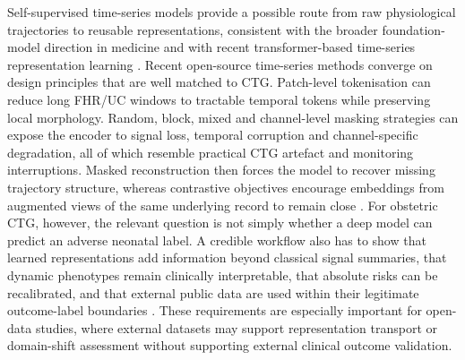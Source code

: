 \documentclass[utf8]{FrontiersinHarvard}
\begin{document}
Self-supervised time-series models provide a possible route from raw physiological trajectories to reusable representations, consistent with the broader foundation-model direction in medicine and with recent transformer-based time-series representation learning \citep{moor2023,zerveas2021,nie2023,yue2022,goswami2024moment}. Recent open-source time-series methods converge on design principles that are well matched to CTG. Patch-level tokenisation can reduce long FHR/UC windows to tractable temporal tokens while preserving local morphology. Random, block, mixed and channel-level masking strategies can expose the encoder to signal loss, temporal corruption and channel-specific degradation, all of which resemble practical CTG artefact and monitoring interruptions. Masked reconstruction then forces the model to recover missing trajectory structure, whereas contrastive objectives encourage embeddings from augmented views of the same underlying record to remain close \citep{nie2023,yue2022,zhang2022tfc}. For obstetric CTG, however, the relevant question is not simply whether a deep model can predict an adverse neonatal label. A credible workflow also has to show that learned representations add information beyond classical signal summaries, that dynamic phenotypes remain clinically interpretable, that absolute risks can be recalibrated, and that external public data are used within their legitimate outcome-label boundaries \citep{tripodai2024,vanCalster2019,vickers2006}. These requirements are especially important for open-data studies, where external datasets may support representation transport or domain-shift assessment without supporting external clinical outcome validation.
\end{document}
